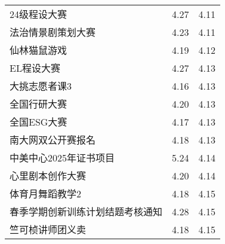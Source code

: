 \documentclass[letterpaper, 12pt]{article}
\begin{document}
\begin{multicols}{2}
{\begin{longtable}{|>{\centering\arraybackslash}m{}|m{}|m{}|}
    24级程设大赛 & 4.27 & 4.11\\
    法治情景剧策划大赛 & 4.23 & 4.11\\
    仙林猫鼠游戏 & 4.19 & 4.12\\
    EL程设大赛 & 4.27 & 4.13\\
    大挑志愿者课3 & 4.16 & 4.13\\
    全国行研大赛 & 4.20 & 4.13\\
    全国ESG大赛 & 4.17 & 4.13\\
    南大网双公开赛报名 & 4.18 & 4.13\\
    中美中心2025年证书项目 & 5.24 & 4.14\\
    心里剧本创作大赛 & 4.20 & 4.14\\
    体育月舞蹈教学2 & 4.18 & 4.15\\
    春季学期创新训练计划结题考核通知 & 4.28 & 4.15\\
    竺可桢讲师团义卖 & 4.18 & 4.15\\
    
    \hline
\end{longtable}
\unskip
\unpenalty
\unpenalty}\unvbox\colbbox
\end{multicols}
\end{document}
